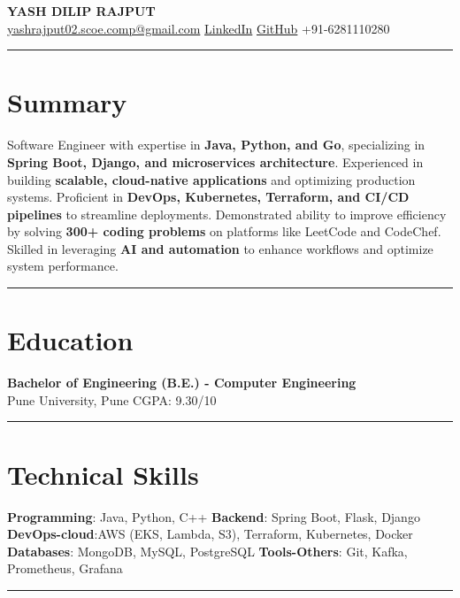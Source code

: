 \documentclass[a4paper,10pt]{article}
\begin{document}
\begin{center}
    {\LARGE \textbf{YASH DILIP RAJPUT}}\\
    \href{mailto:yashrajput02.scoe.comp@gmail.com}{yashrajput02.scoe.comp@gmail.com} \textbar
    \href{https://www.linkedin.com/in/yashrajput7232}{LinkedIn} \textbar
    \href{https://github.com/yash7232}{GitHub} \textbar
    +91-6281110280
\end{center}

\hrule
\vspace{3pt}
\section*{Summary}  
Software Engineer with expertise in \textbf{Java, Python, and Go}, specializing in \textbf{Spring Boot, Django, and microservices architecture}. Experienced in building \textbf{scalable, cloud-native applications} and optimizing production systems. Proficient in \textbf{DevOps, Kubernetes, Terraform, and CI/CD pipelines} to streamline deployments. Demonstrated ability to improve efficiency by solving \textbf{300+ coding problems} on platforms like LeetCode and CodeChef. Skilled in leveraging \textbf{AI and automation} to enhance workflows and optimize system performance.

\vspace{3 pt}
\hrule
\vspace{3pt}

\section*{Education}
\textbf{Bachelor of Engineering (B.E.) - Computer Engineering}\\
Pune University, Pune \hfill CGPA: 9.30/10
\vspace{3 pt}
\hrule
\vspace{3 pt}

\section*{Technical Skills}
\textbf{Programming}: Java, Python, C++ \textbar \space
\textbf{Backend}: Spring Boot, Flask, Django \textbar \space
\textbf{DevOps-cloud}:AWS (EKS, Lambda, S3), Terraform, Kubernetes, Docker \textbar \space
\textbf{Databases}: MongoDB, MySQL, PostgreSQL \textbar \space
\textbf{Tools-Others}: Git, Kafka, Prometheus, Grafana
\vspace{3pt}

\hrule
\vspace{3pt}
\end{document}

